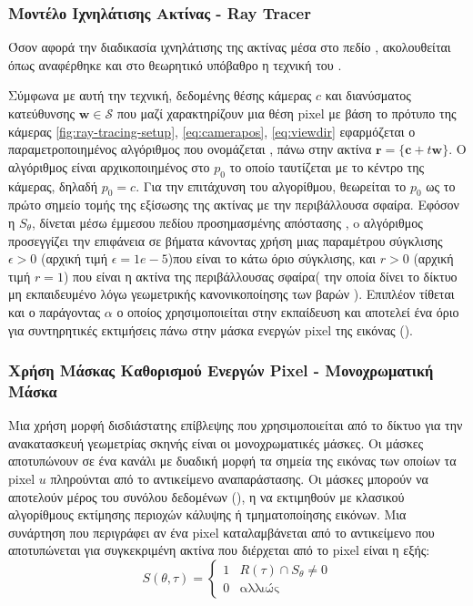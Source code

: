      
\subsubsection{Μοντέλο Ιχνηλάτισης Ακτίνας - Ray Tracer}
    Όσον αφορά την διαδικασία ιχνηλάτισης της ακτίνας μέσα στο πεδίο , ακολουθείται όπως αναφέρθηκε και στο θεωρητικό υπόβαθρο η τεχνική του \textbf{}.

    Σύμφωνα με αυτή την τεχνική, δεδομένης θέσης κάμερας \textbf{$c$} και διανύσματος κατεύθυνσης $\mathbf{\boldsymbol{w}} \in \mathcal{S}$ που μαζί χαρακτηρίζουν μια θέση pixel με βάση το πρότυπο της κάμερας \ref{fig:ray-tracing-setup}, \ref{eq:camerapos}, \ref{eq:viewdir} εφαρμόζεται ο παραμετροποιημένος αλγόριθμος  που ονομάζεται , πάνω στην ακτίνα $\mathbf{r} = \{ \mathbf{c} + t \mathbf{\boldsymbol{w}}\}$. Ο αλγόριθμος είναι αρχικοποιημένος στο \(p_0\) το οποίο ταυτίζεται με το κέντρο της κάμερας, δηλαδή \(p_0 = c\). Για την επιτάχυνση του αλγορίθμου, θεωρείται το \(p_0\) ως το πρώτο σημείο τομής της εξίσωσης της ακτίνας με την περιβάλλουσα σφαίρα. Εφόσον η $S_\theta$, δίνεται μέσω έμμεσου πεδίου προσημασμένης απόστασης ,  o αλγόριθμος προσεγγίζει την επιφάνεια σε βήματα κάνοντας χρήση μιας παραμέτρου σύγκλισης $\epsilon > 0$ (αρχική τιμή \(\epsilon = 1e-5\))που είναι το κάτω όριο σύγκλισης, και $r > 0$ (αρχική τιμή \(r = 1\)) που είναι η ακτίνα της περιβάλλουσας σφαίρα( την οποία δίνει το δίκτυο μη εκπαιδευμένο λόγω γεωμετρικής κανονικοποίησης των βαρών \cite{gropp2020implicit}). Επιπλέον τίθεται και ο παράγοντας $\alpha$ ο οποίος χρησιμοποιείται στην εκπαίδευση και αποτελεί ένα όριο για συντηρητικές εκτιμήσεις πάνω στην μάσκα ενεργών pixel της εικόνας (). 
\subsubsection{Χρήση Μάσκας Καθορισμού Ενεργών Pixel - Μονοχρωματική Μάσκα }
Μια χρήση μορφή δισδιάστατης επίβλεψης που χρησιμοποιείται από το δίκτυο για την ανακατασκευή γεωμετρίας  σκηνής είναι οι μονοχρωματικές μάσκες. Οι μάσκες αποτυπώνουν σε ένα κανάλι με δυαδική μορφή τα σημεία της εικόνας των οποίων τα pixel $u$ πληρούνται από το αντικείμενο αναπαράστασης. Οι μάσκες μπορούν να αποτελούν μέρος του συνόλου δεδομένων (), η να εκτιμηθούν με κλασικού αλγορίθμους εκτίμησης περιοχών κάλυψης ή τμηματοποίησης εικόνων. Μια συνάρτηση που περιγράφει αν ένα pixel καταλαμβάνεται από το αντικείμενο που αποτυπώνεται για συγκεκριμένη ακτίνα που διέρχεται από το pixel είναι η εξής:
\[
     S(\theta, \tau) = 
     \begin{cases}
        1 & \text{\(R(\tau) \cap S_\theta \neq 0\)} \\
        0 & \text{αλλιώς}
     \end{cases}
\]

